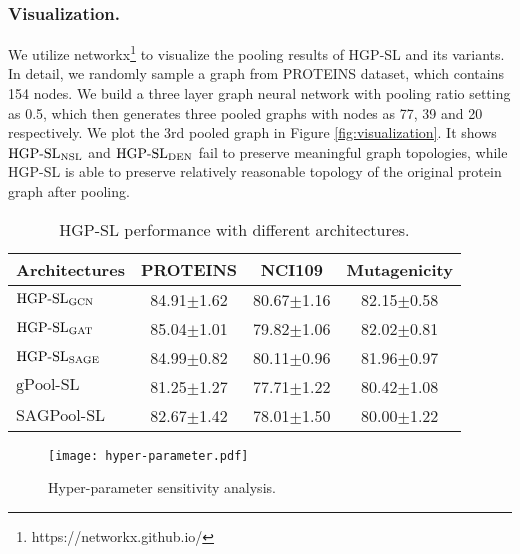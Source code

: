 \documentclass[letterpaper]{article} \usepackage{aaai20}  \usepackage{times}  \usepackage{helvet} \usepackage{courier}  \usepackage[hyphens]{url}  \usepackage{graphicx} \urlstyle{rm} \def\UrlFont{\rm}  \usepackage{graphicx}  \frenchspacing  \setlength{\pdfpagewidth}{8.5in}  \setlength{\pdfpageheight}{11in}
\begin{document}
\subsubsection{Visualization.}
We utilize networkx\footnote{https://networkx.github.io/} to visualize the pooling results of HGP-SL and its variants. In detail, we randomly sample a graph from PROTEINS dataset, which contains 154 nodes. We build a three layer graph neural network with pooling ratio setting as 0.5, which then generates three pooled graphs with nodes as 77, 39 and 20 respectively. We plot the 3rd pooled graph in Figure \ref{fig:visualization}. It shows $\text{HGP-SL}_{{\rm NSL}}$ and $\text{HGP-SL}_{{\rm DEN}}$ fail to preserve meaningful graph topologies, while HGP-SL is able to preserve relatively reasonable topology of the original protein graph after pooling.

\begin{table}[t]
    \centering
    \small
    \begin{tabular}{lccc}
    \hline
    Architectures  				  	& PROTEINS			& NCI109			& Mutagenicity		\\
    \hline	
    $\text{HGP-SL}_{{\rm GCN}}$  	& 84.91$\pm$1.62 	& 80.67$\pm$1.16	& 82.15$\pm$0.58 	\\
    $\text{HGP-SL}_{{\rm GAT}}$  	& 85.04$\pm$1.01	& 79.82$\pm$1.06	& 82.02$\pm$0.81	\\
    $\text{HGP-SL}_{{\rm SAGE}}$ 	& 84.99$\pm$0.82    & 80.11$\pm$0.96 	& 81.96$\pm$0.97	\\
    \hline
    $\text{gPool-SL}$ 				& 81.25$\pm$1.27    & 77.71$\pm$1.22 	& 80.42$\pm$1.08	\\
    $\text{SAGPool-SL}$ 			& 82.67$\pm$1.42 	& 78.01$\pm$1.50	& 80.00$\pm$1.22	\\
    \hline
    \end{tabular}
    \caption{HGP-SL performance with different architectures.}
    \label{tab:result_architecture}
\end{table}

\begin{figure}
  \centering
  \texttt{[image: hyper-parameter.pdf]}
  \caption{Hyper-parameter sensitivity analysis.}
  \label{fig:hyper_parameter}
\end{figure}
\end{document}

